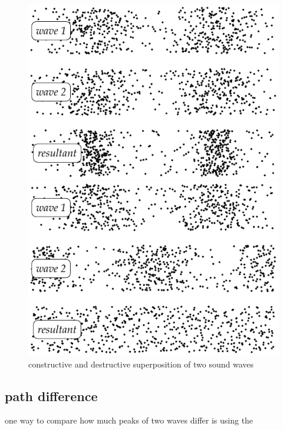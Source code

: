 \begin{figure}[htp]
	\centering
	\noindent\begin{minipage}{0.5\linewidth}
		\centering
		\includegraphics[width=.95\textwidth]{longitudinal+I.pdf}
	\end{minipage}\hfil
	\begin{minipage}{0.5\linewidth}
		\centering
		\includegraphics[width=.95\textwidth]{longitudinal-I.pdf}
	\end{minipage}
	\caption{constructive and destructive superposition of two sound waves} 
\end{figure}


\subsection{path difference}

one way to compare how much peaks of two waves differ is using the 

